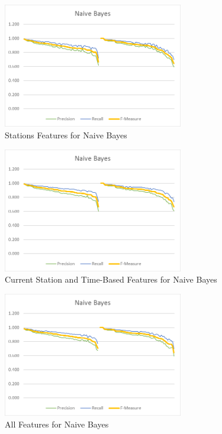 \begin{figure}[H]
	\centering
	\includegraphics[width=0.7\textwidth]{files/high_vs_low_frequency/naive_bayes_stas}
	\caption{Stations Features for Naive Bayes}
\end{figure}

\begin{figure}[H]
	\centering
	\includegraphics[width=0.7\textwidth]{files/high_vs_low_frequency/naive_bayes_csta_ts}
	\caption{Current Station and Time-Based Features for Naive Bayes}
\end{figure}

\begin{figure}[H]
	\centering
	\includegraphics[width=0.7\textwidth]{files/high_vs_low_frequency/naive_bayes_all}
	\caption{All Features for Naive Bayes}
\end{figure}


